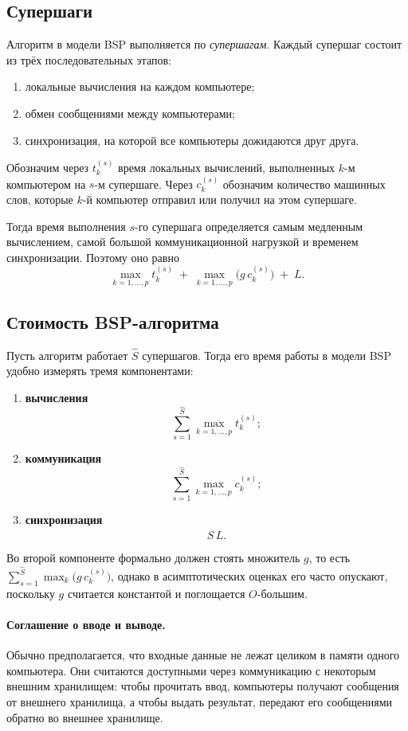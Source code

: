\subsection{Супершаги}

Алгоритм в модели BSP выполняется по \emph{супершагам}. Каждый супершаг состоит из трёх последовательных этапов:
\begin{enumerate}
	\item локальные вычисления на каждом компьютере;
	\item обмен сообщениями между компьютерами;
	\item синхронизация, на которой все компьютеры дожидаются друг друга.
\end{enumerate}

Обозначим через \(t_k^{(s)}\) время локальных вычислений, выполненных \(k\)-м компьютером на \(s\)-м супершаге.
Через \(c_k^{(s)}\) обозначим количество машинных слов, которые \(k\)-й компьютер отправил или получил на этом супершаге.

Тогда время выполнения \(s\)-го супершага определяется самым медленным вычислением, самой большой коммуникационной нагрузкой и временем синхронизации. Поэтому оно равно
\[
\max_{k=1,\dots,p} t_k^{(s)}
\;+\;
\max_{k=1,\dots,p} \bigl(g\,c_k^{(s)}\bigr)
\;+\;
L.
\]

\subsection{Стоимость BSP-алгоритма}

Пусть алгоритм работает \(\hat S\) супершагов. Тогда его время работы в модели BSP удобно измерять тремя компонентами:
\begin{enumerate}
	\item \textbf{вычисления}
	\[
	\sum_{s=1}^{\hat S} \max_{k=1,\dots,p} t_k^{(s)};
	\]
	
	\item \textbf{коммуникация}
	\[
	\sum_{s=1}^{\hat S} \max_{k=1,\dots,p} c_k^{(s)};
	\]
	
	\item \textbf{синхронизация}
	\[
	\hat S\,L.
	\]
\end{enumerate}

Во второй компоненте формально должен стоять множитель \(g\), то есть \(\sum_{s=1}^{\hat S} \max_{k} \bigl(g\,c_k^{(s)}\bigr)\), однако в асимптотических оценках его часто опускают, поскольку \(g\) считается константой и поглощается \(O\)-большим.

\paragraph{Соглашение о вводе и выводе.}
Обычно предполагается, что входные данные не лежат целиком в памяти одного компьютера. Они считаются доступными через коммуникацию с некоторым внешним хранилищем: чтобы прочитать ввод, компьютеры получают сообщения от внешнего хранилища, а чтобы выдать результат, передают его сообщениями обратно во внешнее хранилище.


